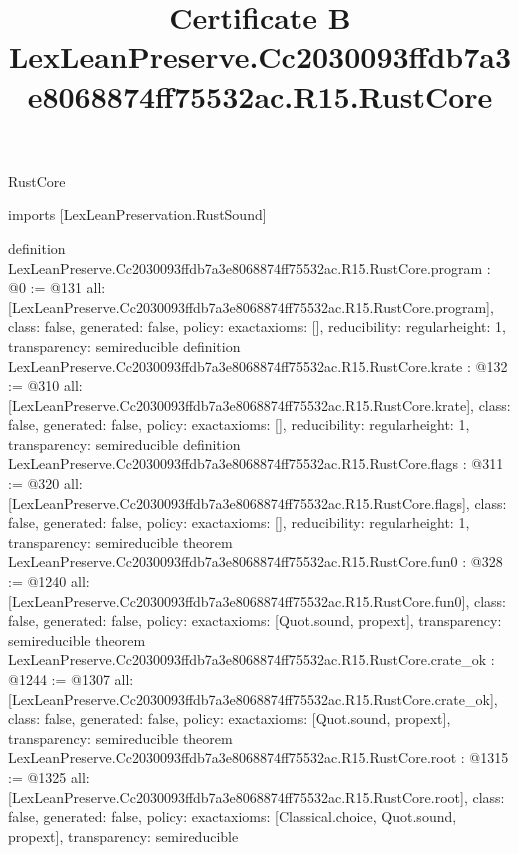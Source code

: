 \begin{lexlean}{RustCore}
\title{Certificate B LexLeanPreserve.Cc2030093ffdb7a3e8068874ff75532ac.R15.RustCore}
\begin{coremodule}
imports [LexLeanPreservation.RustSound]

definition LexLeanPreserve.Cc2030093ffdb7a3e8068874ff75532ac.R15.RustCore.program : @0 := @131 {
  all: [LexLeanPreserve.Cc2030093ffdb7a3e8068874ff75532ac.R15.RustCore.program],
  class: false,
  generated: false,
  policy: exact{axioms: []},
  reducibility: regular{height: 1},
  transparency: semireducible
}
definition LexLeanPreserve.Cc2030093ffdb7a3e8068874ff75532ac.R15.RustCore.krate : @132 := @310 {
  all: [LexLeanPreserve.Cc2030093ffdb7a3e8068874ff75532ac.R15.RustCore.krate],
  class: false,
  generated: false,
  policy: exact{axioms: []},
  reducibility: regular{height: 1},
  transparency: semireducible
}
definition LexLeanPreserve.Cc2030093ffdb7a3e8068874ff75532ac.R15.RustCore.flags : @311 := @320 {
  all: [LexLeanPreserve.Cc2030093ffdb7a3e8068874ff75532ac.R15.RustCore.flags],
  class: false,
  generated: false,
  policy: exact{axioms: []},
  reducibility: regular{height: 1},
  transparency: semireducible
}
theorem LexLeanPreserve.Cc2030093ffdb7a3e8068874ff75532ac.R15.RustCore.fun0 : @328 := @1240 {
  all: [LexLeanPreserve.Cc2030093ffdb7a3e8068874ff75532ac.R15.RustCore.fun0],
  class: false,
  generated: false,
  policy: exact{axioms: [Quot.sound, propext]},
  transparency: semireducible
}
theorem LexLeanPreserve.Cc2030093ffdb7a3e8068874ff75532ac.R15.RustCore.crate_ok : @1244 := @1307 {
  all: [LexLeanPreserve.Cc2030093ffdb7a3e8068874ff75532ac.R15.RustCore.crate_ok],
  class: false,
  generated: false,
  policy: exact{axioms: [Quot.sound, propext]},
  transparency: semireducible
}
theorem LexLeanPreserve.Cc2030093ffdb7a3e8068874ff75532ac.R15.RustCore.root : @1315 := @1325 {
  all: [LexLeanPreserve.Cc2030093ffdb7a3e8068874ff75532ac.R15.RustCore.root],
  class: false,
  generated: false,
  policy: exact{axioms: [Classical.choice, Quot.sound, propext]},
  transparency: semireducible
}


\end{coremodule}
\end{lexlean}
